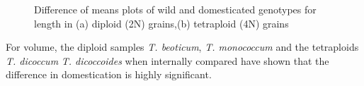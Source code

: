 \documentclass[11pt]{report}
\begin{document}
\begin{figure}[!ht]
  \hfill
  \caption{Difference of means plots of wild and domesticated genotypes for length in (a) diploid (2N) grains,(b) tetraploid (4N) grains}
  \label{fig:lenmeansdiff}
\end{figure}

For volume, the diploid samples \emph{T. beoticum}, \emph{T. monococcum}  and the tetraploids \emph{T. dicoccum}  \emph{T. dicoccoides} when internally compared have shown that the difference in domestication is highly significant.
\end{document}
